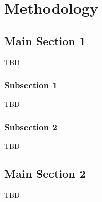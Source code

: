 
\chapter{Methodology} %


\section{Main Section 1}

TBD

\subsection{Subsection 1}

TBD


\subsection{Subsection 2}

TBD


\section{Main Section 2}

TBD